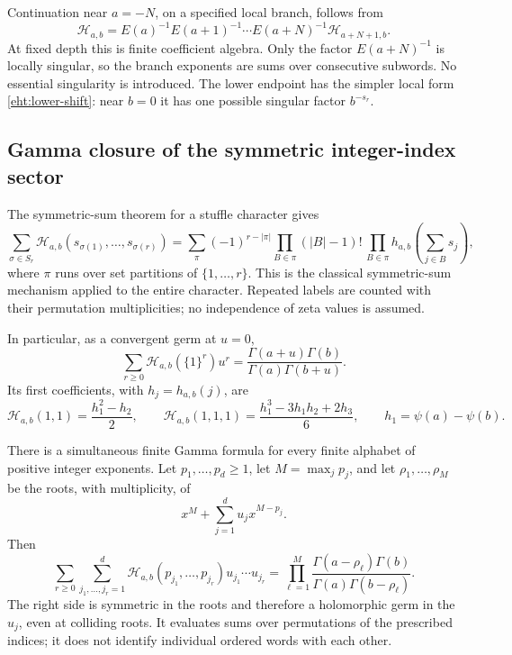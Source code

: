 Continuation near $a=-N$, on a specified local branch, follows from
\[
 \mathcal H_{a,b}=E(a)^{-1}E(a+1)^{-1}\cdots E(a+N)^{-1}
                         \mathcal H_{a+N+1,b}.
\]
At fixed depth this is finite coefficient algebra.  Only the factor
$E(a+N)^{-1}$ is locally singular, so the branch exponents are sums over
consecutive subwords.  No essential singularity is introduced.  The
lower endpoint has the simpler local form \eqref{eht:lower-shift}: near
$b=0$ it has one possible singular factor $b^{-s_r}$.

\subsection{Gamma closure of the symmetric integer-index sector}

The symmetric-sum theorem for a stuffle character gives
\begin{equation}\label{eht:symmetric}
 \sum_{\sigma\in S_r}\mathcal H_{a,b}(s_{\sigma(1)},\ldots,s_{\sigma(r)})
 =\sum_{\pi}(-1)^{r-|\pi|}
       \prod_{B\in\pi}(|B|-1)!\,
       \prod_{B\in\pi}h_{a,b}\left(\sum_{j\in B}s_j\right),
\end{equation}
where $\pi$ runs over set partitions of $\{1,\ldots,r\}$.
This is the classical symmetric-sum mechanism applied to the entire
character.  Repeated labels are counted with their permutation
multiplicities; no independence of zeta values is assumed.

In particular, as a convergent germ at $u=0$,
\begin{equation}\label{eht:ones-Gamma}
 \boxed{\sum_{r\ge0}\mathcal H_{a,b}(\{1\}^r)u^r
       =\frac{\Gamma(a+u)\Gamma(b)}{\Gamma(a)\Gamma(b+u)}.}
\end{equation}
Its first coefficients, with $h_j=h_{a,b}(j)$, are
\[
 \mathcal H_{a,b}(1,1)=\frac{h_1^2-h_2}{2},\qquad
 \mathcal H_{a,b}(1,1,1)=\frac{h_1^3-3h_1h_2+2h_3}{6},
 \qquad h_1=\psi(a)-\psi(b).
\]

There is a simultaneous finite Gamma formula for every finite alphabet
of positive integer exponents.  Let $p_1,\ldots,p_d\ge1$, let
$M=\max_jp_j$, and let $\rho_1,\ldots,\rho_M$ be the roots, with
multiplicity, of
\[
 x^M+\sum_{j=1}^du_jx^{M-p_j}.
\]
Then
\begin{equation}\label{eht:alphabet-Gamma}
 \boxed{\sum_{r\ge0}\sum_{j_1,\ldots,j_r=1}^d
  \mathcal H_{a,b}(p_{j_1},\ldots,p_{j_r})u_{j_1}\cdots u_{j_r}
  =\prod_{\ell=1}^M
       \frac{\Gamma(a-\rho_\ell)\Gamma(b)}
            {\Gamma(a)\Gamma(b-\rho_\ell)}.}
\end{equation}
The right side is symmetric in the roots and therefore a holomorphic
germ in the $u_j$, even at colliding roots.  It evaluates sums over
permutations of the prescribed indices; it does not identify individual
ordered words with each other.

